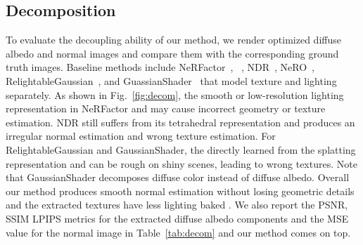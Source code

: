 \subsection{Decomposition}
To evaluate the decoupling ability of our method, we render optimized diffuse albedo and normal images and compare them with the corresponding ground truth images. 
Baseline methods include NeRFactor~\cite{NeRFactor}, ~\cite{TensoIR}, NDR~\cite{NvDiffRec}, NeRO~\cite{NeRO}, RelightableGaussian~\cite{RelightableGaussian}, and GuassianShader~\cite{GaussianShader} that model texture and lighting separately. 
As shown in Fig.~\ref{fig:decom}, the smooth or low-resolution lighting representation in NeRFactor and  may cause incorrect geometry or texture estimation. 
NDR still suffers from its tetrahedral representation and produces an irregular normal estimation and wrong texture estimation. 
For RelightableGaussian and GaussianShader, the  directly learned from the  splatting representation and can be rough on shiny scenes, leading to wrong textures. 
Note that GaussianShader decomposes diffuse color instead of diffuse albedo. 
Overall our method produces smooth normal estimation without losing geometric details and the extracted textures have less lighting baked . 
We also report the PSNR, SSIM  LPIPS metrics for the extracted diffuse albedo components and the MSE value for the normal image in Table~\ref{tab:decom} and our method comes on top. 


